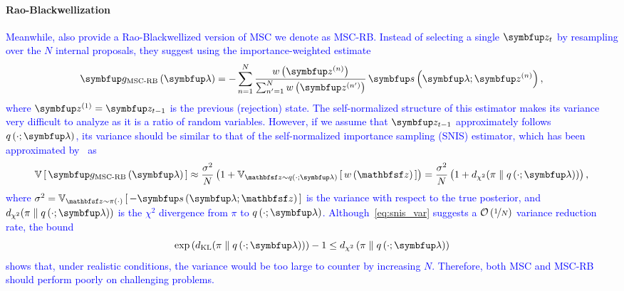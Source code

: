 \paragraph{Rao-Blackwellization}
\textcolor{blue}{
Meanwhile, \citeauthor{NEURIPS2020_b2070693} also provide a Rao-Blackwellized version of MSC we denote as MSC-RB.
Instead of selecting a single \(\vz_t\) by resampling over the \(N\) internal proposals, they suggest using the importance-weighted estimate%
}
{
\begin{align*}
        \vg_{\text{MSC-RB}}\left(\vlambda\right) = - \sum^{N}_{n=1} \frac{w\left(\vz^{(n)}\right)}{ \sum^{N}_{n^{\prime}=1} w\left(\vz^{(n^{\prime})}\right)} \, \vs\left(\vlambda;\vz^{(n)}\right),
\end{align*}%
}%
\textcolor{blue}{
where \(\vz^{(1)} = \vz_{t-1}\) is the previous (rejection) state.
The self-normalized structure of this estimator makes its variance very difficult to analyze as it is a ratio of random variables.
However, if we assume that \(\vz_{t-1}\) approximately follows \(q\left(\cdot; \vlambda\right)\), its variance should be similar to that of the self-normalized importance sampling (SNIS) estimator, which has been approximated by~\citet{kong_note_1992, kong_sequential_1994, elvira_rethinking_2022} as%
}
\begin{align}
\V{ \vg_{\text{MSC-RB}}\left(\vlambda\right) } \approx
\frac{
    \sigma^2
}{
    N
}
\left(1 + \Vsub{\rvvz \sim q\left(\cdot; \vlambda\right)}{ w\left(\rvvz\right) }\right)
=
\frac{
    \sigma^2
}{
    N
}
\left( 1 + \DChi{\pi}{q\left(\cdot; \vlambda\right)} \right),\label{eq:snis_var}
\end{align}
\textcolor{blue}{
where \(\sigma^2 = \Vsub{\rvvz \sim \pi\left(\cdot\right)}{ -\vs\left(\vlambda; \rvvz \right) }\) is the variance with respect to the true posterior, and \(\DChi{\pi}{q\left(\cdot; \vlambda\right)}\) is the \(\chi^2\) divergence from \(\pi\) to \(q\left(\cdot; \vlambda\right)\).
Although~\cref{eq:snis_var} suggests a \(\mathcal{O}\left(\nicefrac{1}{N}\right)\) variance reduction rate, the bound
\[
\exp\left( \DKL{\pi}{q\left(\cdot; \vlambda\right)} \right) - 1 \leq  d_{\chi^2}\left(\pi \parallel q\left(\cdot; \vlambda\right) \right)
\]
shows that, under realistic conditions, the variance would be too large to counter by increasing \(N\).
Therefore, both MSC and MSC-RB should perform poorly on challenging problems.
}

\vspace{-0.1in}
